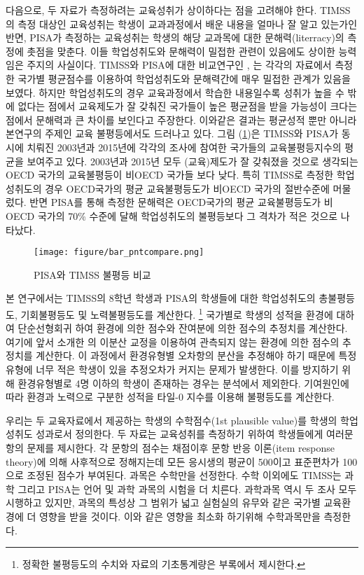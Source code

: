 다음으로, 두 자료가 측정하려는 교육성취가 상이하다는 점을 고려해야 한다.
TIMSS의 측정 대상인 교육성취는 학생이 교과과정에서 배운 내용을 얼마나 잘 알고 있는가인 반면, PISA가 측정하는 교육성취는 학생의 해당 교과목에 대한 문해력(literracy)의 측정에 촛점을 맞춘다.
이들 학업성취도와 문해력이 밀접한 관련이 있음에도 상이한 능력임은 주지의 사실이다.
TIMSS와 PISA에 대한 비교연구인 \cite{wu09}, \cite{Klieme16}는 각각의 자료에서 측정한 국가별 평균점수를 이용하여 학업성취도와 문해력간에 매우 밀접한 관계가 있음을 보였다.
하지만 학업성취도의 경우 교육과정에서 학습한 내용일수록 성취가 높을 수 밖에 없다는 점에서 교육제도가 잘 갖춰진 국가들이 높은 평균점을 받을 가능성이 크다는 점에서 문해력과 큰 차이를 보인다고 주장한다. 
이와같은 결과는 평균성적 뿐만 아니라 본연구의 주제인 교육 불평등에서도 드러나고 있다.
그림 (\ref{fig:bar_pntcompare})은 TIMSS와 PISA가 동시에 치뤄진 2003년과 2015년에 각각의 조사에 참여한 국가들의 교육불평등지수의 평균을 보여주고 있다.
2003년과 2015년 모두 (교육)제도가 잘 갖춰졌을 것으로 생각되는 OECD 국가의 교육불평등이 비OECD 국가들 보다 낮다.
특히 TIMSS로 측정한 학업성취도의 경우 OECD국가의 평균 교육불평등도가 비OECD 국가의 절반수준에 머물렀다.
반면 PISA를 통해 측정한 문해력은 OECD국가의 평균 교육불평등도가 비OECD 국가의 70\% 수준에 달해 학업성취도의 불평등보다 그 격차가 적은 것으로 나타났다.

\begin{figure}
    \centering
    \texttt{[image: figure/bar\_pntcompare.png]}
    \caption{PISA와 TIMSS 불평등 비교}
    \label{fig:bar_pntcompare}
\end{figure}

본 연구에서는 TIMSS의 8학년 학생과 PISA의 학생들에 대한 학업성취도의 총불평등도, 기회불평등도 및 노력불평등도를 계산한다.
\footnote{정확한 불평등도의 수치와 자료의 기초통계량은 부록에서 제시한다.}
국가별로 학생의 성적을 환경에 대하여 단순선형회귀 하여 환경에 의한 점수와 잔여분에 의한 점수의 추정치를 계산한다. 
여기에 앞서 소개한 \cite{betl12}의 이분산 교정을 이용하여 관측되지 않는 환경에 의한 점수의 추정치를 계산한다.
이 과정에서 환경유형별 오차항의 분산을 추정해야 하기 때문에 특정 유형에 너무 적은 학생이 있을 추정오차가 커지는 문제가 발생한다.
이를 방지하기 위해 환경유형별로 4명 이하의 학생이 존재하는 경우는 분석에서 제외한다.
기여원인에 따라 환경과 노력으로 구분한 성적을 타일-0 지수를 이용해 불평등도를 계산한다.

우리는 두 교육자료에서 제공하는 학생의 수학점수(1st plausible value)를 학생의 학업성취도 성과로서 정의한다.
두 자료는 교육성취를 측정하기 위하여 학생들에게 여러문항의 문제를 제시한다.
각 문항의 점수는 채점이후 문항 반응 이론(item response theory)에 의해 사후적으로 정해지는데 모든 응시생의 평균이 500이고 표준편차가 100으로 조정된 점수가 부여된다.
과목은 수학만을 선정한다. 수학 이외에도 TIMSS는 과학 그리고 PISA는 언어 및 과학 과목의 시험을 더 치른다. 과학과목 역시 두 조사 모두 시행하고 있지만, 과목의 특성상 그 범위가 넓고 실험실의 유무와 같은 국가별 교육환경에 더 영향을 받을 것이다. 이와 같은 영향을 최소화 하기위해 수학과목만을 측정한다. 
 
